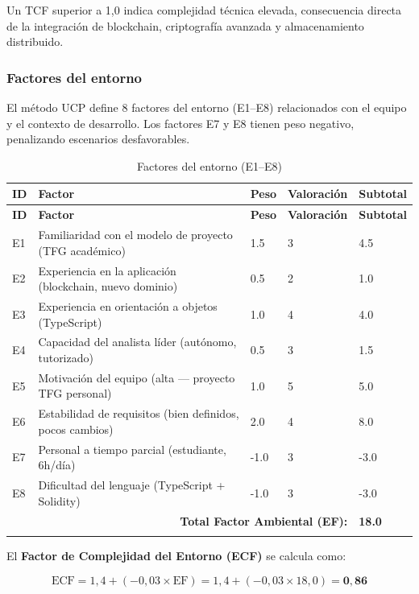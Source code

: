 \documentclass[11pt, a4paper]{article}
\begin{document}
Un TCF superior a 1,0 indica complejidad técnica elevada, consecuencia directa de la integración de blockchain, criptografía avanzada y almacenamiento distribuido.

\subsubsection{Factores del entorno}

El método UCP define 8 factores del entorno (E1--E8) relacionados con el equipo y el contexto de desarrollo. Los factores E7 y E8 tienen peso negativo, penalizando escenarios desfavorables.

\begin{longtable}{|p{0.8cm}|p{7.5cm}|p{1.3cm}|p{1.8cm}|p{2cm}|}
\hline
\textbf{ID} & \textbf{Factor} & \textbf{Peso} & \textbf{Valoración} & \textbf{Subtotal} \\
\hline
\endfirsthead
\hline
\textbf{ID} & \textbf{Factor} & \textbf{Peso} & \textbf{Valoración} & \textbf{Subtotal} \\
\hline
\endhead
E1 & Familiaridad con el modelo de proyecto (TFG académico) & 1.5 & 3 & 4.5 \\
\hline
E2 & Experiencia en la aplicación (blockchain, nuevo dominio) & 0.5 & 2 & 1.0 \\
\hline
E3 & Experiencia en orientación a objetos (TypeScript) & 1.0 & 4 & 4.0 \\
\hline
E4 & Capacidad del analista líder (autónomo, tutorizado) & 0.5 & 3 & 1.5 \\
\hline
E5 & Motivación del equipo (alta --- proyecto TFG personal) & 1.0 & 5 & 5.0 \\
\hline
E6 & Estabilidad de requisitos (bien definidos, pocos cambios) & 2.0 & 4 & 8.0 \\
\hline
E7 & Personal a tiempo parcial (estudiante, 6h/día) & -1.0 & 3 & -3.0 \\
\hline
E8 & Dificultad del lenguaje (TypeScript + Solidity) & -1.0 & 3 & -3.0 \\
\hline
\multicolumn{4}{|r|}{\textbf{Total Factor Ambiental (EF):}} & \textbf{18.0} \\
\hline
\caption{Factores del entorno (E1--E8)}
\end{longtable}

\vspace{0.5em}
\noindent El \textbf{Factor de Complejidad del Entorno (ECF)} se calcula como:

\begin{equation}
\text{ECF} = 1{,}4 + (-0{,}03 \times \text{EF}) = 1{,}4 + (-0{,}03 \times 18{,}0) = \mathbf{0{,}86}
\end{equation}
\end{document}
